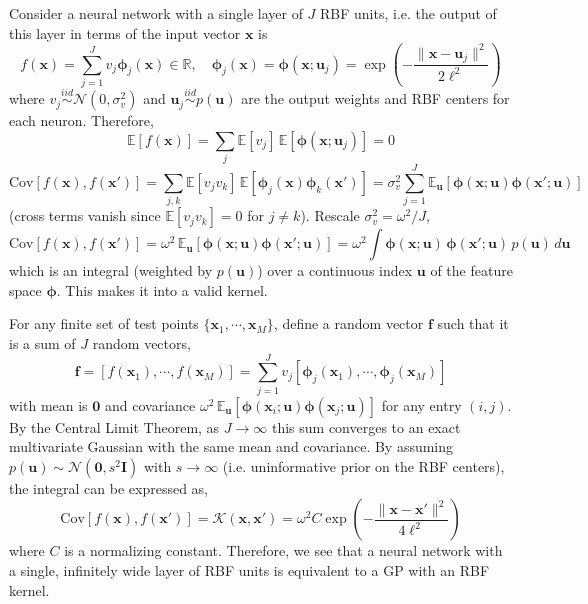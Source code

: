 \documentclass[11pt]{article}
\begin{document}
Consider a neural network with a single layer of $J$ RBF units, i.e. the output of this layer in terms of the input vector $\boldsymbol{x}$ is
\[
f(\boldsymbol{x}) = \sum_{j=1}^J v_j \boldsymbol{\phi}_j (\boldsymbol{x}) \in \mathbb{R}, \quad \boldsymbol{\phi}_j (\boldsymbol{x}) = \boldsymbol{\phi}(\boldsymbol{x}; \boldsymbol{u}_j) = \exp\left(-\frac{\|\boldsymbol{x} - \boldsymbol{u}_j \|^2}{2\ell^2}\right)
\]
where $v_j \overset{iid}{\sim} \mathcal{N}(0, \sigma_v^2)$ and $\boldsymbol{u}_j \overset{iid}{\sim} p(\boldsymbol{u})$ are the output weights and RBF centers for each neuron. Therefore,
\[
\mathbb{E}[f(\boldsymbol{x})] = \sum_j \mathbb{E}[v_j] \, \mathbb{E}[\boldsymbol{\phi}(\boldsymbol{x}; \boldsymbol{u}_j)] = 0
\]
\[
\text{Cov}[f(\boldsymbol{x}), f(\boldsymbol{x}')] = \sum_{j,k} \mathbb{E}[v_j v_k] \, \mathbb{E}[\boldsymbol{\phi}_j(\boldsymbol{x}) \boldsymbol{\phi}_k(\boldsymbol{x}')] = \sigma_v^2 \sum_{j=1}^{J} \mathbb{E}_{\boldsymbol{u}}[\boldsymbol{\phi}(\boldsymbol{x}; \boldsymbol{u}) \boldsymbol{\phi}(\boldsymbol{x}'; \boldsymbol{u})]
\]
(cross terms vanish since $\mathbb{E}[v_j v_k] = 0$ for $j \neq k$). Rescale $\sigma_v^2 = \omega^2 / J$,
\[
\text{Cov}[f(\boldsymbol{x}), f(\boldsymbol{x}')] = \omega^2 \, \mathbb{E}_{\boldsymbol{u}} \left[ \boldsymbol{\phi}(\boldsymbol{x}; \boldsymbol{u}) \boldsymbol{\phi}(\boldsymbol{x}'; \boldsymbol{u}) \right] = \omega^2 \int \boldsymbol{\phi}(\boldsymbol{x}; \boldsymbol{u}) \, \boldsymbol{\phi}(\boldsymbol{x}'; \boldsymbol{u}) \, p(\boldsymbol{u}) \, d\boldsymbol{u}
\]
which is an integral (weighted by $p(\boldsymbol{u})$) over a continuous index $\boldsymbol{u}$ of the feature space $\boldsymbol{\phi}$. This makes it into a valid kernel.

For any finite set of test points $\{ \boldsymbol{x}_1, \cdots, \boldsymbol{x}_M \}$, define a random vector $\boldsymbol{f}$ such that it is a sum of $J$ random vectors,
\[
\boldsymbol{f} = [f(\boldsymbol{x}_1), \cdots,  f(\boldsymbol{x}_M)] = \sum_{j=1}^J v_j [\boldsymbol{\phi}_j(\boldsymbol{x}_1), \cdots, \boldsymbol{\phi}_j(\boldsymbol{x}_M)]
\]
with mean is $\boldsymbol{0}$ and covariance $\omega^2 \, \mathbb{E}_{\boldsymbol{u}} \left[ \boldsymbol{\phi}(\boldsymbol{x}_i; \boldsymbol{u}) \boldsymbol{\phi}(\boldsymbol{x}_j; \boldsymbol{u}) \right]$ for any entry $(i,j)$.
By the Central Limit Theorem, as $J \to \infty$ this sum converges to an exact multivariate Gaussian with the same mean and covariance.
By assuming $p(\boldsymbol{u}) \sim \mathcal{N}(\boldsymbol{0}, s^2\mathbf{I})$ with $s \to \infty$ (i.e. uninformative prior on the RBF centers), the integral can be expressed as,
\[
\text{Cov}[f(\boldsymbol{x}), f(\boldsymbol{x}')] = \mathcal{K}(\boldsymbol{x}, \boldsymbol{x}') = \omega^2 C \exp \left( -\frac{\|\boldsymbol{x} - \boldsymbol{x}' \|^2}{4\ell^2} \right)
\]
where $C$ is a normalizing constant. Therefore, we see that a neural network with a single, infinitely wide
layer of RBF units is equivalent to a GP with an RBF kernel.
\end{document}
